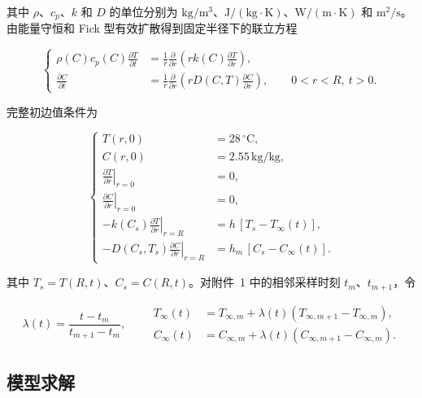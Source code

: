 其中 $\rho$、$c_p$、$k$ 和 $D$ 的单位分别为 $\mathrm{kg/m^3}$、$\mathrm{J/(kg\cdot K)}$、$\mathrm{W/(m\cdot K)}$ 和 $\mathrm{m^2/s}$。由能量守恒和 Fick 型有效扩散得到固定半径下的联立方程

\begin{equation}
\left\{
\begin{aligned}
  \rho(C)c_p(C)\frac{\partial T}{\partial t}
  &=\frac{1}{r}\frac{\partial}{\partial r}
    \left(rk(C)\frac{\partial T}{\partial r}\right),\\
  \frac{\partial C}{\partial t}
  &=\frac{1}{r}\frac{\partial}{\partial r}
    \left(rD(C,T)\frac{\partial C}{\partial r}\right),
  \qquad 0<r<R,\ t>0.
\end{aligned}
\right.
\label{eq:q2-pde}
\end{equation}

完整初边值条件为

\begin{equation}
\left\{
\begin{aligned}
  T(r,0)&=28\,{}^\circ\mathrm{C},\\[2pt]
  C(r,0)&=2.55\,\mathrm{kg/kg},\\[2pt]
  \left.\frac{\partial T}{\partial r}\right|_{r=0}&=0,\\[2pt]
  \left.\frac{\partial C}{\partial r}\right|_{r=0}&=0,\\[2pt]
  -k(C_s)\left.\frac{\partial T}{\partial r}\right|_{r=R}
    &=h\,[T_s-T_\infty(t)],\\[2pt]
  -D(C_s,T_s)\left.\frac{\partial C}{\partial r}\right|_{r=R}
    &=h_m\,[C_s-C_\infty(t)].
\end{aligned}
\right.
\label{eq:q2-ibvp}
\end{equation}

其中 $T_s=T(R,t)$、$C_s=C(R,t)$。对附件~1 中的相邻采样时刻 $t_m$、$t_{m+1}$，令

\begin{equation}
  \lambda(t)=\frac{t-t_m}{t_{m+1}-t_m},\qquad
  \begin{aligned}
  T_\infty(t)&=T_{\infty,m}+\lambda(t)(T_{\infty,m+1}-T_{\infty,m}),\\
  C_\infty(t)&=C_{\infty,m}+\lambda(t)(C_{\infty,m+1}-C_{\infty,m}).
  \end{aligned}
  \label{eq:q2-boundary-interpolation}
\end{equation}

\subsection{模型求解}

